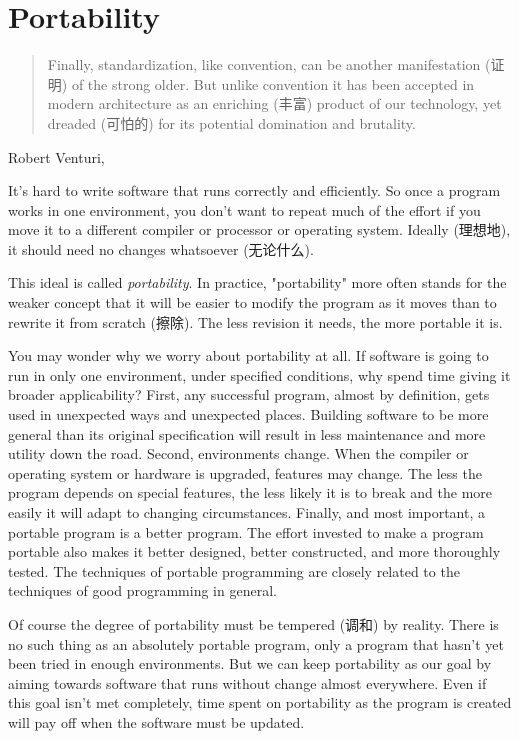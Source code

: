 \chapter{Portability}
\label{chap:portability}
\begin{quote}
    Finally, standardization, like convention, can be another manifestation
    (证明) of the strong older. But unlike convention it has been accepted
    in modern architecture as an enriching (丰富) product of our
    technology, yet dreaded (可怕的) for its potential domination and
    brutality.
\end{quote}
\begin{quotesrc}
    Robert Venturi, 
\end{quotesrc}

It's hard to write software that runs correctly and efficiently. So once a
program works in one environment, you don't want to repeat much of the
effort if you move it to a different compiler or processor or operating
system. Ideally (理想地), it should need no changes whatsoever (无论什么).

This ideal is called \emph{portability}. In practice, "portability" more
often stands for the weaker concept that it will be easier to modify the
program as it moves than to rewrite it from scratch (擦除). The less
revision it needs, the more portable it is.

You may wonder why we worry about portability at all. If software is going
to run in only one environment, under specified conditions, why spend time
giving it broader applicability? First, any successful program, almost by
definition, gets used in unexpected ways and unexpected places. Building
software to be more general than its original specification will result in
less maintenance and more utility down the road. Second, environments
change. When the compiler or operating system or hardware is upgraded,
features may change. The less the program depends on special features, the
less likely it is to break and the more easily it will adapt to changing
circumstances. Finally, and most important, a portable program is a better
program. The effort invested to make a program portable also makes it
better designed, better constructed, and more thoroughly tested. The
techniques of portable programming are closely related to the techniques of
good programming in general.

Of course the degree of portability must be tempered (调和) by reality.
There is no such thing as an absolutely portable program, only a program
that hasn't yet been tried in enough environments. But we can keep
portability as our goal by aiming towards software that runs without change
almost everywhere. Even if this goal isn't met completely, time spent on
portability as the program is created will pay off when the software must
be updated.

